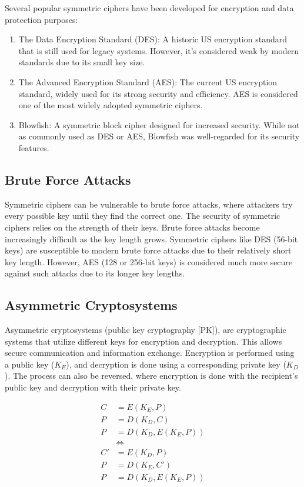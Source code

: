 \documentclass{report}
\newcommand{\exampleBegin}[1]{\begin{tcolorbox}[colback=blue!5!white,colframe=black!75!blue,title={Example:
      #1}]}
\newcommand{\exampleEnd}{\end{tcolorbox}}
\newcommand{\asideBegin}[1]{\begin{tcolorbox}[colback=orange!5!white,colframe=black!75!orange,title={Aside:
      #1}]}
\newcommand{\asideEnd}{\end{tcolorbox}}
\begin{document}
\exampleBegin{Cipher Cipher Cipher!}
Several popular symmetric ciphers have been developed for encryption and data protection purposes:
\begin{enumerate}[label=\textit{(\roman*)}]
\item The Data Encryption Standard (DES): A historic US encryption standard that is still used for
  legacy systems. However, it's considered weak by modern standards due to its small key size.
\item The Advanced Encryption Standard (AES): The current US encryption standard, widely used for
  its strong security and efficiency. AES is considered one of the most widely adopted symmetric
  ciphers.
\item Blowfish: A symmetric block cipher designed for increased security. While not as commonly used
  as DES or AES, Blowfish was well-regarded for its security features. 
\end{enumerate}
\exampleEnd


\subsection{Brute Force Attacks}
Symmetric ciphers can be vulnerable to brute force attacks, where attackers try every possible key
until they find the correct one. The security of symmetric ciphers relies on the strength of their
keys. Brute force attacks become increasingly difficult as the key length grows. Symmetric ciphers
like DES (56-bit keys) are susceptible to modern brute force attacks due to their relatively short
key length. However, AES (128 or 256-bit keys) is considered much more secure against such attacks
due to its longer key lengths. 


\subsection{Asymmetric Cryptosystems}
\label{subsec:ENCR}
Asymmetric cryptosystems (public key cryptography [PK]), are cryptographic systems that
utilize different keys for encryption and decryption. This allows secure communication and
information exchange. Encryption is performed using a public key ($K_E$), and decryption is done using
a corresponding private key ($K_D$). The process can also be reversed, where encryption is done with
the recipient's public key and decryption with their private key. 

\asideBegin{Algebraic Representation}
\begin{align*}
  C &= E(K_E, P) \\
  P &= D(K_D, C) \\
  P &= D(K_D, E(K_E, P)) \\
  &\iff \\
  C' &= E(K_D, P) \\
  P &= D(K_E, C') \\
  P &= D(K_D, E(K_E, P)) \\
\end{align*}
\asideEnd
\end{document}
